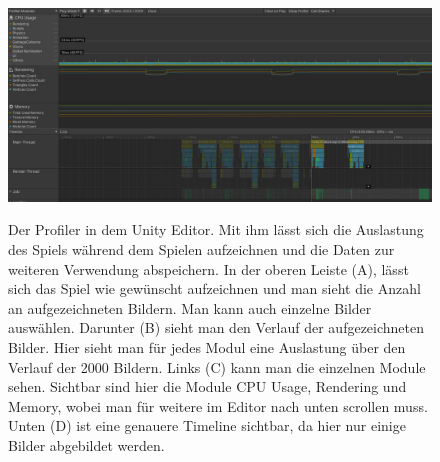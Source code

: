 \begin{figure}[H]
\centering
\begin{annotatedFigure}
	{\includegraphics[scale=0.428]{Bilder/Profiler.png}}
\end{annotatedFigure}
\caption{Der Profiler in dem Unity Editor. Mit ihm lässt sich die Auslastung des Spiels während dem Spielen aufzeichnen und die Daten zur weiteren Verwendung abspeichern. In der oberen Leiste (A), lässt sich das Spiel wie gewünscht aufzeichnen und man sieht die Anzahl an aufgezeichneten Bildern. Man kann auch einzelne Bilder auswählen. Darunter (B) sieht man den Verlauf der aufgezeichneten Bilder. Hier sieht man für jedes Modul eine Auslastung über den Verlauf der 2000 Bildern. Links (C) kann man die einzelnen Module sehen. Sichtbar sind hier die Module CPU Usage, Rendering und Memory, wobei man für weitere im Editor nach unten scrollen muss. Unten (D) ist eine genauere Timeline sichtbar, da hier nur einige Bilder abgebildet werden.}
\label{fig:profiler}
\end{figure}